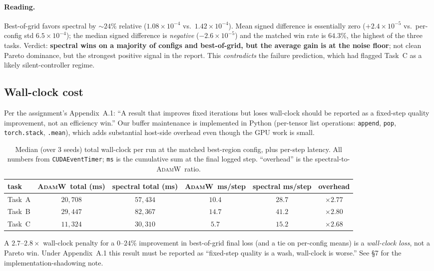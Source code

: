 \documentclass{article}
\newcommand{\Adamw}{\textsc{AdamW}}
\begin{document}
\paragraph{Reading.}  Best-of-grid favors spectral by $\sim\!24\%$
relative ($1.08\!\times\!10^{-4}$ vs.\ $1.42\!\times\!10^{-4}$).
Mean signed difference is essentially zero ($+2.4\!\times\!10^{-5}$
vs.\ per-config std $6.5\!\times\!10^{-4}$); the median signed
difference is \emph{negative} ($-2.6\!\times\!10^{-5}$) and the
matched win rate is $64.3\%$, the highest of the three tasks.
Verdict: \textbf{spectral wins on a majority of configs and
best-of-grid, but the average gain is at the noise floor}; not
clean Pareto dominance, but the strongest positive signal in the
report.  This \emph{contradicts} the failure prediction, which had
flagged Task~C as a likely silent-controller regime.

\subsection{Wall-clock cost}
Per the assignment's Appendix~A.1: ``A result that improves fixed
iterations but loses wall-clock should be reported as a fixed-step
quality improvement, not an efficiency win.''  Our buffer
maintenance is implemented in Python (per-tensor list operations:
\texttt{append}, \texttt{pop}, \texttt{torch.stack}, \texttt{.mean}),
which adds substantial host-side overhead even though the GPU work
is small.

\begin{table}[h]
\centering
\caption{Median (over 3 seeds) total wall-clock per run at the
matched best-region config, plus per-step latency.  All numbers from
\texttt{CUDAEventTimer}; \texttt{ms} is the cumulative sum at the
final logged step.  ``overhead'' is the spectral-to-\Adamw\ ratio.}
\label{tab:timing}
\begin{tabular}{l c c c c c}
\toprule
task & \Adamw\ total (ms) & spectral total (ms) & \Adamw\ ms/step & spectral ms/step & overhead\\
\midrule
Task~A & $20{,}708$ & $57{,}434$ & $10.4$ & $28.7$ & $\times 2.77$\\
Task~B & $29{,}447$ & $82{,}367$ & $14.7$ & $41.2$ & $\times 2.80$\\
Task~C & $11{,}324$ & $30{,}310$ & $5.7$  & $15.2$ & $\times 2.68$\\
\bottomrule
\end{tabular}
\end{table}

A $2.7$--$2.8\times$ wall-clock penalty for a $0$--$24\%$ improvement
in best-of-grid final loss (and a tie on per-config means) is a
\emph{wall-clock loss}, not a Pareto win.  Under Appendix~A.1 this
result must be reported as ``fixed-step quality is a wash, wall-clock
is worse.''  See §7 for the implementation-shadowing note.
\end{document}
